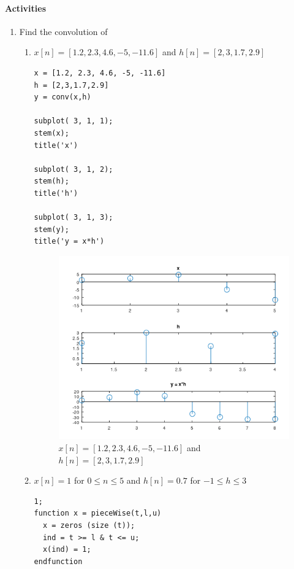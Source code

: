 \documentclass[12pt]{article}
\begin{document}
\paragraph{Activities\\}
\begin{enumerate}
    \item {Find the convolution of\\
        \begin{enumerate}
            \item $x[n] = [1.2, 2.3, 4.6, -5, -11.6]$ and $h[n] = [2,3,1.7,2.9]$
                \begin{Verbatim}[frame=single]
x = [1.2, 2.3, 4.6, -5, -11.6]
h = [2,3,1.7,2.9]
y = conv(x,h)

subplot( 3, 1, 1);
stem(x);
title('x')

subplot( 3, 1, 2);
stem(h);
title('h')

subplot( 3, 1, 3);
stem(y);
title('y = x*h')
                \end{Verbatim}
             \begin{figure}[h!]
                \centering
                \includegraphics{labss/Convolution1a.PNG}
                \caption{$x[n] = [1.2, 2.3, 4.6, -5, -11.6]$ and $h[n] = [2,3,1.7,2.9]$}
             \end{figure}   
            \pagebreak
             \item $x[n] = 1$ for $0	\leq n \leq 5$ and $h[n] = 0.7$ for $-1	\leq h	\leq 3$
            \begin{Verbatim}[frame=single]
1;
function x = pieceWise(t,l,u)
  x = zeros (size (t));
  ind = t >= l & t <= u;
  x(ind) = 1;
endfunction


\end{Verbatim}
\end{enumerate}}
\end{enumerate}
\end{document}
